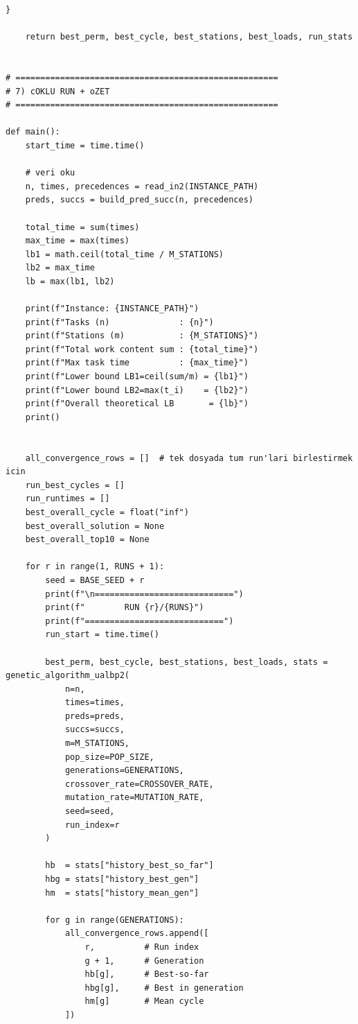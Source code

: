 \documentclass[12pt,a4paper]{article}
\begin{document}
\begin{lstlisting}[style=atomone,
caption={Python implementation of the genetic algorithm for the U-shaped assembly line balancing problem (UALBP-II) on the ARC83 instance.},
label={lst:ga-arc83-full}]
    }

    return best_perm, best_cycle, best_stations, best_loads, run_stats


# =====================================================
# 7) cOKLU RUN + oZET
# =====================================================

def main():
    start_time = time.time()

    # veri oku
    n, times, precedences = read_in2(INSTANCE_PATH)
    preds, succs = build_pred_succ(n, precedences)

    total_time = sum(times)
    max_time = max(times)
    lb1 = math.ceil(total_time / M_STATIONS)
    lb2 = max_time
    lb = max(lb1, lb2)

    print(f"Instance: {INSTANCE_PATH}")
    print(f"Tasks (n)              : {n}")
    print(f"Stations (m)           : {M_STATIONS}")
    print(f"Total work content sum : {total_time}")
    print(f"Max task time          : {max_time}")
    print(f"Lower bound LB1=ceil(sum/m) = {lb1}")
    print(f"Lower bound LB2=max(t_i)    = {lb2}")
    print(f"Overall theoretical LB       = {lb}")
    print()


    all_convergence_rows = []  # tek dosyada tum run'lari birlestirmek icin
    run_best_cycles = []
    run_runtimes = []
    best_overall_cycle = float("inf")
    best_overall_solution = None
    best_overall_top10 = None

    for r in range(1, RUNS + 1):
        seed = BASE_SEED + r
        print(f"\n============================")
        print(f"        RUN {r}/{RUNS}")
        print(f"============================")
        run_start = time.time()

        best_perm, best_cycle, best_stations, best_loads, stats = genetic_algorithm_ualbp2(
            n=n,
            times=times,
            preds=preds,
            succs=succs,
            m=M_STATIONS,
            pop_size=POP_SIZE,
            generations=GENERATIONS,
            crossover_rate=CROSSOVER_RATE,
            mutation_rate=MUTATION_RATE,
            seed=seed,
            run_index=r
        )

        hb  = stats["history_best_so_far"]
        hbg = stats["history_best_gen"]
        hm  = stats["history_mean_gen"]

        for g in range(GENERATIONS):
            all_convergence_rows.append([
                r,          # Run index
                g + 1,      # Generation
                hb[g],      # Best-so-far
                hbg[g],     # Best in generation
                hm[g]       # Mean cycle
            ])


\end{lstlisting}
\end{document}
